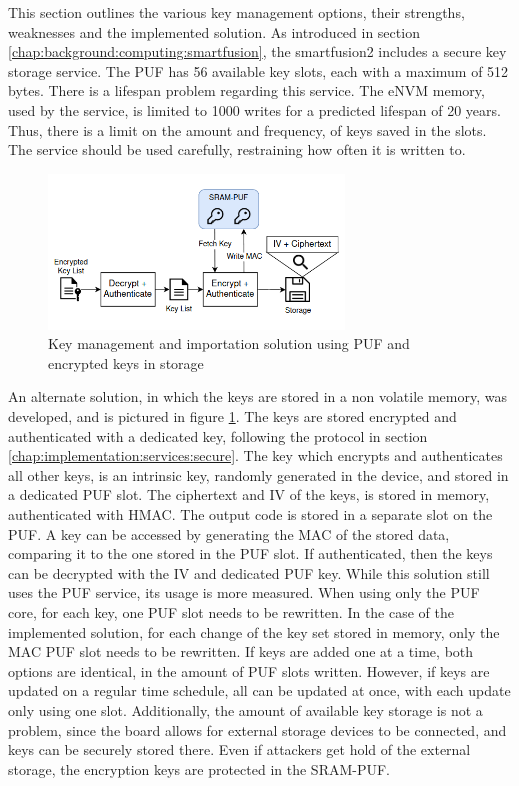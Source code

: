 This section outlines the various key management options, their strengths, weaknesses and the implemented solution. 
As introduced in section \ref{chap:background:computing:smartfusion}, the smartfusion2 includes a secure key storage service. The PUF has 56 available key slots, each with a maximum of 512 bytes. There is a lifespan problem regarding this service. The eNVM memory, used by the service, is limited to 1000 writes for a predicted lifespan of 20 years. Thus, there is a limit on the amount and frequency, of keys saved in the slots. The service should be used carefully, restraining how often it is written to.
\begin{figure}[h!]
	\centering
	\includegraphics[width=0.7\textwidth]{./Images/key-management.png}
	\caption{Key management and importation solution using PUF and encrypted keys in storage}
	\label{fig:implementation:key-management}
\end{figure}
An alternate solution, in which the keys are stored in a non volatile memory, was developed, and is pictured in figure \ref{fig:implementation:key-management}. The keys are stored encrypted and authenticated with a dedicated key, following the protocol in section \ref{chap:implementation:services:secure}.
The key which encrypts and authenticates all other keys, is an intrinsic key, randomly generated in the device, and stored in a dedicated PUF slot. The ciphertext and IV of the keys, is stored in memory, authenticated with HMAC. The output code is stored in a separate slot on the PUF.
A key can be accessed by generating the MAC of the stored data, comparing it to the one stored in the PUF slot. If authenticated, then the keys can be decrypted with the IV and dedicated PUF key.
While this solution still uses the PUF service, its usage is more measured. When using only the PUF core, for each key, one PUF slot needs to be rewritten. In the case of the implemented solution, for each change of the key set stored in memory, only the MAC PUF slot needs to be rewritten. If keys are added one at a time, both options are identical, in the amount of PUF slots written. However, if keys are updated on a regular time schedule, all can be updated at once, with each update only using one slot. Additionally, the amount of available key storage is not a problem, since the board allows for external storage devices to be connected, and keys can be securely stored there. Even if attackers get hold of the external storage, the encryption keys are protected in the SRAM-PUF.


